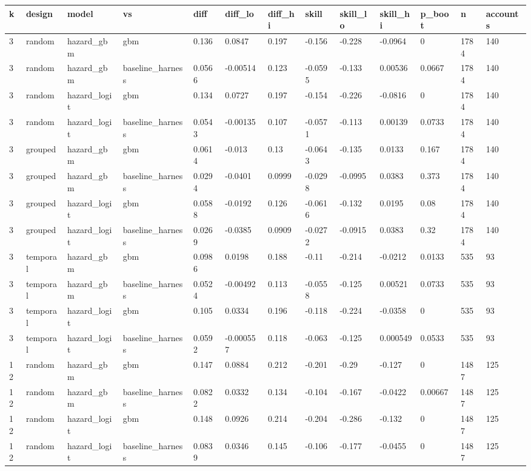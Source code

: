 \begin{tabular}{lllllllllllll}
\toprule
k & design & model & vs & diff & diff\_lo & diff\_hi & skill & skill\_lo & skill\_hi & p\_boot & n & accounts \\
\midrule
3 & random & hazard\_gbm & gbm & 0.136 & 0.0847 & 0.197 & -0.156 & -0.228 & -0.0964 & 0 & 1784 & 140 \\
3 & random & hazard\_gbm & baseline\_harness & 0.0566 & -0.00514 & 0.123 & -0.0595 & -0.133 & 0.00536 & 0.0667 & 1784 & 140 \\
3 & random & hazard\_logit & gbm & 0.134 & 0.0727 & 0.197 & -0.154 & -0.226 & -0.0816 & 0 & 1784 & 140 \\
3 & random & hazard\_logit & baseline\_harness & 0.0543 & -0.00135 & 0.107 & -0.0571 & -0.113 & 0.00139 & 0.0733 & 1784 & 140 \\
3 & grouped & hazard\_gbm & gbm & 0.0614 & -0.013 & 0.13 & -0.0643 & -0.135 & 0.0133 & 0.167 & 1784 & 140 \\
3 & grouped & hazard\_gbm & baseline\_harness & 0.0294 & -0.0401 & 0.0999 & -0.0298 & -0.0995 & 0.0383 & 0.373 & 1784 & 140 \\
3 & grouped & hazard\_logit & gbm & 0.0588 & -0.0192 & 0.126 & -0.0616 & -0.132 & 0.0195 & 0.08 & 1784 & 140 \\
3 & grouped & hazard\_logit & baseline\_harness & 0.0269 & -0.0385 & 0.0909 & -0.0272 & -0.0915 & 0.0383 & 0.32 & 1784 & 140 \\
3 & temporal & hazard\_gbm & gbm & 0.0986 & 0.0198 & 0.188 & -0.11 & -0.214 & -0.0212 & 0.0133 & 535 & 93 \\
3 & temporal & hazard\_gbm & baseline\_harness & 0.0524 & -0.00492 & 0.113 & -0.0558 & -0.125 & 0.00521 & 0.0733 & 535 & 93 \\
3 & temporal & hazard\_logit & gbm & 0.105 & 0.0334 & 0.196 & -0.118 & -0.224 & -0.0358 & 0 & 535 & 93 \\
3 & temporal & hazard\_logit & baseline\_harness & 0.0592 & -0.000557 & 0.118 & -0.063 & -0.125 & 0.000549 & 0.0533 & 535 & 93 \\
12 & random & hazard\_gbm & gbm & 0.147 & 0.0884 & 0.212 & -0.201 & -0.29 & -0.127 & 0 & 1487 & 125 \\
12 & random & hazard\_gbm & baseline\_harness & 0.0822 & 0.0332 & 0.134 & -0.104 & -0.167 & -0.0422 & 0.00667 & 1487 & 125 \\
12 & random & hazard\_logit & gbm & 0.148 & 0.0926 & 0.214 & -0.204 & -0.286 & -0.132 & 0 & 1487 & 125 \\
12 & random & hazard\_logit & baseline\_harness & 0.0839 & 0.0346 & 0.145 & -0.106 & -0.177 & -0.0455 & 0 & 1487 & 125 \\

\end{tabular}
